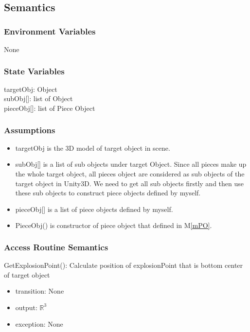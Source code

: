 \documentclass[12pt, titlepage]{article}
\newcommand{\mref}[1]{M\ref{#1}}
\begin{document}
\subsection{Semantics}

\subsubsection{Environment Variables}

None

\subsubsection{State Variables}

targetObj: Object\\
subObj[]: list of Object\\
pieceObj[]: list of Piece Object\\

\subsubsection{Assumptions}

\noindent
\begin{itemize}
	\item targetObj is the 3D model of target object in scene.
	\item subObj[] is a list of sub objects under target Object. Since all pieces make up the whole target object, all pieces object are considered as sub objects of the target object in Unity3D. We need to get all sub objects firstly and then use these sub objects to construct piece objects defined by myself.
	\item pieceObj[] is a list of piece objects defined by myself.
	\item PieceObj() is constructor of piece object that defined in \mref{mPO}. \an{use \mref{mPO} here.}
\end{itemize}

\subsubsection{Access Routine Semantics}

\noindent GetExplosionPoint():
Calculate position of explosionPoint that is bottom center of target object
\begin{itemize}
	\item transition: None
	\item output: $\mathbb{R}^{3}$
	\item exception: None
\end{itemize}
\end{document}
